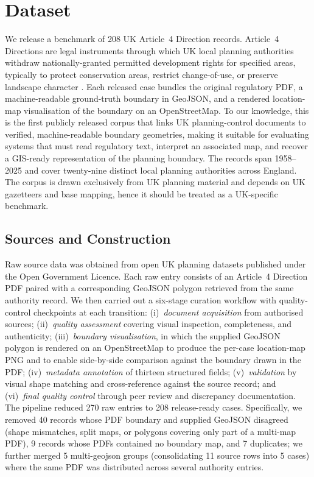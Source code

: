 \documentclass[11pt]{article}
\begin{document}
\section{Dataset}
We release a benchmark of 208 UK Article~4 Direction records. Article~4 Directions are legal instruments through which UK local planning authorities withdraw nationally-granted permitted development rights for specified areas, typically to protect conservation areas, restrict change-of-use, or preserve landscape character \citep{mhclg2024planningpracticeguidance}. Each released case bundles the original regulatory PDF, a machine-readable ground-truth boundary in GeoJSON, and a rendered location-map visualisation of the boundary on an OpenStreetMap. To our knowledge, this is the first publicly released corpus that links UK planning-control documents to verified, machine-readable boundary geometries, making it suitable for evaluating systems that must read regulatory text, interpret an associated map, and recover a GIS-ready representation of the planning boundary. The records span 1958--2025 and cover twenty-nine distinct local planning authorities across England. The corpus is drawn exclusively from UK planning material and depends on UK gazetteers and base mapping, hence it should be treated as a UK-specific benchmark.

\subsection{Sources and Construction}
 Raw source data was obtained from open UK planning datasets published under the Open Government Licence. Each raw entry consists of an Article~4 Direction PDF paired with a corresponding GeoJSON polygon retrieved from the same authority record. We then carried out a six-stage curation workflow with quality-control checkpoints at each transition: (i)~\emph{document acquisition} from authorised sources; (ii)~\emph{quality assessment} covering visual inspection, completeness, and authenticity; (iii)~\emph{boundary visualisation}, in which the supplied GeoJSON polygon is rendered on an OpenStreetMap to produce the per-case location-map PNG and to enable side-by-side comparison against the boundary drawn in the PDF; (iv)~\emph{metadata annotation} of thirteen structured fields; (v)~\emph{validation} by visual shape matching and cross-reference against the source record; and (vi)~\emph{final quality control} through peer review and discrepancy documentation. The pipeline reduced 270 raw entries to 208 release-ready cases. Specifically, we removed 40 records whose PDF boundary and supplied GeoJSON disagreed (shape mismatches, split maps, or polygons covering only part of a multi-map PDF), 9 records whose PDFs contained no boundary map, and 7 duplicates; we further merged 5 multi-geojson groups (consolidating 11 source rows into 5 cases) where the same PDF was distributed across several authority entries.
\end{document}
